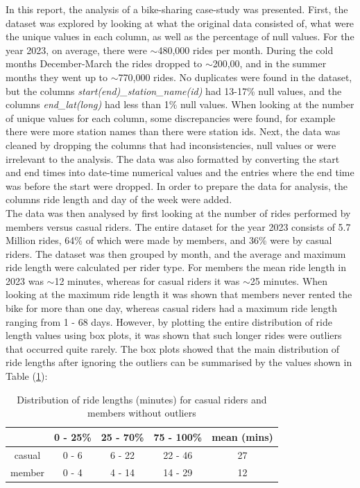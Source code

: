 \documentclass[12pt]{article}
\begin{document}
In this report, the analysis of a bike-sharing case-study was presented. First, the dataset was explored by looking at   what the original data consisted of, what were the unique values in each column, as well as the percentage of null values. For the year 2023, on average, there were $\sim$480,000 rides per month. During the cold months December-March the rides dropped to $\sim$200,00, and in the summer months they went up to $\sim$770,000 rides. No duplicates were found in the dataset, but the columns \textit{start(end)\_station\_name(id)} had 13-17\% null values, and the columns \textit{end\_lat(long)} had less than 1\% null values. When looking at the number of unique values for each column, some discrepancies were found, for example there were more station names than there were station ids. Next, the data was cleaned by dropping the columns that had inconsistencies, null values or were irrelevant to the analysis. The data was also formatted by converting the start and end times into date-time numerical values and the entries where the end time was before the start were dropped. In order to prepare the data for analysis, the columns ride length and day of the week were added. \\

The data was then analysed by first looking at the number of rides performed by members versus casual riders. The entire dataset for the year 2023 consists of 5.7 Million rides, 64\% of which were made by members, and 36\% were by casual riders. The dataset was then grouped by month, and the average and maximum ride length were calculated per rider type. For members the mean ride length in 2023 was $\sim$12 minutes, whereas for casual riders it was $\sim$25 minutes. When looking at the maximum ride length it was shown that members never rented the bike for more than one day, whereas casual riders had a maximum ride length ranging from 1 - 68 days. However, by plotting the entire distribution of ride length values using box plots, it was shown that such longer rides were outliers that occurred quite rarely. The box plots showed that the main distribution of ride lengths after ignoring the outliers can be summarised by the values shown in Table (\ref{table1}): \\

\begin{table}[h]
\begin{center}
\begin{tabular}{ | c | c | c| c | c |  } 
\hline
   	& 0 - 25\% 	& 25 - 70\% 	& 75 - 100\% &  mean (mins)  \\ 
  \hline
casual 	& 0 - 6 		&  6 - 22 		& 22 - 46 & 27 \\
\hline
member 	& 0 - 4 		& 4 - 14		& 14 - 29 & 12 \\
\hline
\end{tabular}
\caption{Distribution of ride lengths (minutes) for casual riders and members without outliers}
\label{table1}
\end{center} 
\end{table}
\end{document}
